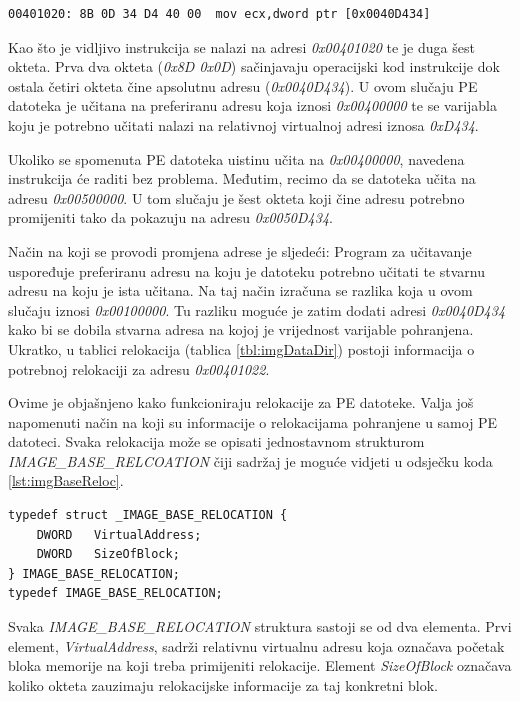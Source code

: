 \documentclass[times, utf8, diplomski, numeric]{fer}
\begin{document}
\begin{lstlisting}[frame=single, caption=Primjer za relokacije, label={lst:base_reloc}]
00401020: 8B 0D 34 D4 40 00  mov ecx,dword ptr [0x0040D434]
\end{lstlisting}
Kao što je vidljivo instrukcija se nalazi na adresi \emph{0x00401020} te je duga šest okteta. Prva dva okteta (\emph{0x8D 0x0D}) sačinjavaju operacijski kod instrukcije dok ostala četiri okteta čine apsolutnu adresu (\emph{0x0040D434}). U ovom slučaju PE datoteka je učitana na preferiranu adresu koja iznosi \emph{0x00400000} te se varijabla koju je potrebno učitati nalazi na relativnoj virtualnoj adresi iznosa \emph{0xD434}.

Ukoliko se spomenuta PE datoteka uistinu učita na \emph{0x00400000}, navedena instrukcija će raditi bez problema. Međutim, recimo da se datoteka učita na adresu \emph{0x00500000}. U tom slučaju je šest okteta koji čine adresu potrebno promijeniti tako da pokazuju na adresu \emph{0x0050D434}.

Način na koji se provodi promjena adrese je sljedeći: Program za učitavanje uspoređuje preferiranu adresu na koju je datoteku potrebno učitati te stvarnu adresu na koju je ista učitana. Na taj način izračuna se razlika koja u ovom slučaju iznosi \emph{0x00100000}. Tu razliku moguće je zatim dodati adresi \emph{0x0040D434} kako bi se dobila stvarna adresa na kojoj je vrijednost varijable pohranjena. Ukratko, u tablici relokacija (tablica \ref{tbl:imgDataDir}) postoji informacija o potrebnoj relokaciji za adresu \emph{0x00401022}.

Ovime je objašnjeno kako funkcioniraju relokacije za PE datoteke. Valja još napomenuti način na koji su informacije o relokacijama pohranjene u samoj PE datoteci. Svaka relokacija može se opisati jednostavnom strukturom \emph{IMAGE\_BASE\_RELCOATION} čiji sadržaj je moguće vidjeti u odsječku koda \ref{lst:imgBaseReloc}.

\begin{lstlisting}[frame=single, caption=IMAGE\_BASE\_RELOCATION struktura, label={lst:imgBaseReloc}]
typedef struct _IMAGE_BASE_RELOCATION {
    DWORD   VirtualAddress;
    DWORD   SizeOfBlock;
} IMAGE_BASE_RELOCATION;
typedef IMAGE_BASE_RELOCATION;
\end{lstlisting}
Svaka \emph{IMAGE\_BASE\_RELOCATION} struktura sastoji se od dva elementa. Prvi element, \emph{VirtualAddress}, sadrži relativnu virtualnu adresu koja označava početak bloka memorije na koji treba primijeniti relokacije. Element \emph{SizeOfBlock} označava koliko okteta zauzimaju relokacijske informacije za taj konkretni blok. 
\end{document}
